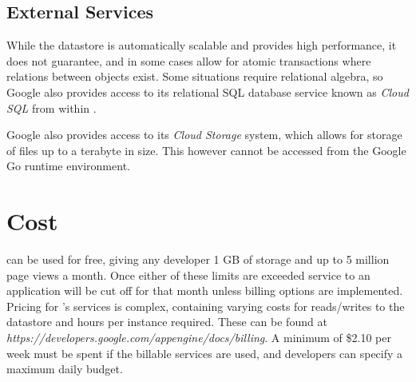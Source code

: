 \subsection{External Services}
While the datastore is automatically scalable and provides high performance, it does not guarantee, and in some cases allow for atomic transactions where relations between objects exist. Some situations require relational algebra, so Google also provides access to its relational SQL database service known as \emph{Cloud SQL} from within \gae{}. 

Google also provides access to its \emph{Cloud Storage} system, which allows for storage of files up to a terabyte in size. This however cannot be accessed from the Google Go runtime environment.

\section{Cost}
\gae{} can be used for free, giving any developer 1 GB of storage and up to 5 million page views a month. Once either of these limits are exceeded service to an application will be cut off for that month unless billing options are implemented. Pricing for \gae{}'s services is complex, containing varying costs for reads/writes to the datastore and hours per instance required. These can be found at \emph{https://developers.google.com/appengine/docs/billing}. A minimum of \$2.10 per week must be spent if the billable services are used, and developers can specify a maximum daily budget.

